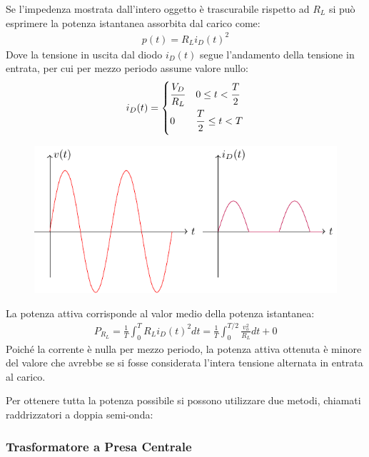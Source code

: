 \documentclass{article}
\numberwithin{equation}{subsection}
\begin{document}
Se l'impedenza mostrata dall'intero oggetto è trascurabile rispetto ad $R_L$ si può esprimere la potenza istantanea assorbita dal carico come:
\begin{gather*}
    p(t)=R_Li_D(t)^2
\end{gather*}
Dove la tensione in uscita dal diodo $i_D(t)$ segue l'andamento della tensione in entrata, per cui per mezzo periodo assume valore nullo:
\begin{gather*}
    i_D(t)=\begin{cases}
        \displaystyle\frac{\strut V_D}{\strut R_L} &0\leq t<\displaystyle\frac{\strut T}{\strut 2}\\
        0& \displaystyle\frac{\strut T}{\strut 2}\leq t<T
    \end{cases}
\end{gather*}
\begin{figure}[H]%
    \centering
    \includegraphics{andamento-corrente-alimentatore-diodo.pdf}%
    \label{fig:andamento-corrente-alimentatore-diodo}
\end{figure}
La potenza attiva corrisponde al valor medio della potenza istantanea:
\begin{gather*}
    P_{R_L}=\displaystyle\frac{1}{T}\int_0^TR_Li_D(t)^2dt=\frac{1}{T}\int_0^{T/2}\frac{v_o^2}{R_L}dt+0
\end{gather*}
Poiché la corrente è nulla per mezzo periodo, la potenza attiva ottenuta è minore del valore che avrebbe se si fosse considerata l'intera tensione alternata 
in entrata al carico. 


Per ottenere tutta la potenza possibile si possono utilizzare due metodi, chiamati raddrizzatori a doppia semi-onda: 

\subsubsection{Trasformatore a Presa Centrale}
\end{document}
